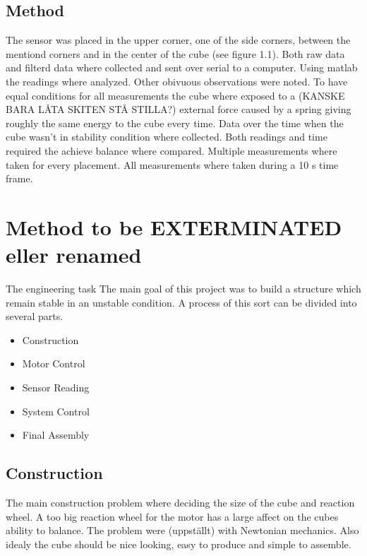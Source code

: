 \documentclass[a4paper,11pt]{kth-mag}
\begin{document}
\section{Method}
The sensor was placed in the upper corner, one of the side corners, between the mentiond corners and in the center of the cube (see figure 1.1). Both raw data and filterd data 
where collected and sent over serial to a computer. Using matlab the readings where analyzed. Other obivuous observations were noted. To have equal conditions for all measurements the cube where exposed to a (KANSKE BARA LÅTA SKITEN STÅ STILLA?)
external force caused by a spring giving roughly the same energy to the cube every time. Data over the time when the cube wasn't in stability condition where collected. 
Both readings and time required the achieve balance where compared. Multiple measurements where taken for every placement.
All measurements where taken during a 10 s time frame.


\chapter{Method to be EXTERMINATED eller renamed}

The engineering task The main goal of this project was to build a structure which remain stable in an unstable condition. A process of this sort can be divided into several parts. 
\begin{itemize}
\item Construction
\item Motor Control
\item Sensor Reading
\item System Control
\item Final Assembly
\end{itemize}

\section{Construction}
The main construction problem where deciding the size of the cube and reaction wheel. A too big reaction wheel for the motor has a large affect on the cubes ability to balance. The problem were (uppställt) with Newtonian mechanics.
Also idealy the cube should be nice looking, easy to produce and simple to assemble. 
 
\end{document}
